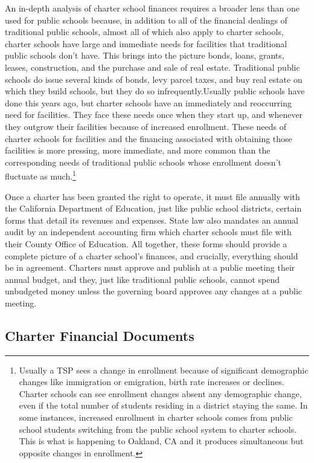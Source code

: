 An in-depth analysis of charter school finances requires a broader lens than one used for public schools because, in addition to all of the financial dealings of traditional public schools, almost all of which also apply to charter schools, charter schools have large and immediate needs for facilities that traditional public schools don’t have. This brings into the picture bonds, loans, grants, leases, construction, and the purchase and sale of real estate. Traditional public schools do issue several kinds of bonds, levy parcel taxes, and buy real estate on which they build schools, but they do so infrequently.Usually public schools have done this years ago, but charter schools have an immediately and reoccurring need for facilities. They face these needs once when they start up, and whenever they outgrow their facilities because of increased enrollment. These needs of charter schools for facilities and the financing associated with obtaining those facilities is more pressing, more immediate, and more common than the corresponding needs of traditional public schools whose enrollment doesn't fluctuate as much.\footnote{Usually a TSP sees a change in enrollment because of significant demographic changes like immigration or emigration, birth rate increases or declines. Charter schools can see enrollment changes absent any demographic change, even if the total number of students residing in a district staying the same. In some instances, increased enrollment in charter schools comes from public school students switching from the public school system to charter schools. This is what is happening to Oakland, CA and it produces simultaneous but opposite changes in enrollment.}

Once a charter has been granted the right to operate, it must file annually with the California Department of Education, just like public school districts, certain forms that detail its revenues and expenses. State law also mandates an annual audit by an independent accounting firm which charter schools must file with their County Office of Education. All together, these forms should provide a complete picture of a charter school's finances, and crucially, everything should be in agreement. Charters must approve and publish at a public meeting their annual budget, and they, just like traditional public schools, cannot spend unbudgeted money unless the governing board approves any changes at a public meeting.

\subsection{Charter Financial Documents}\label{sec:charter-financial-docs}\indent


